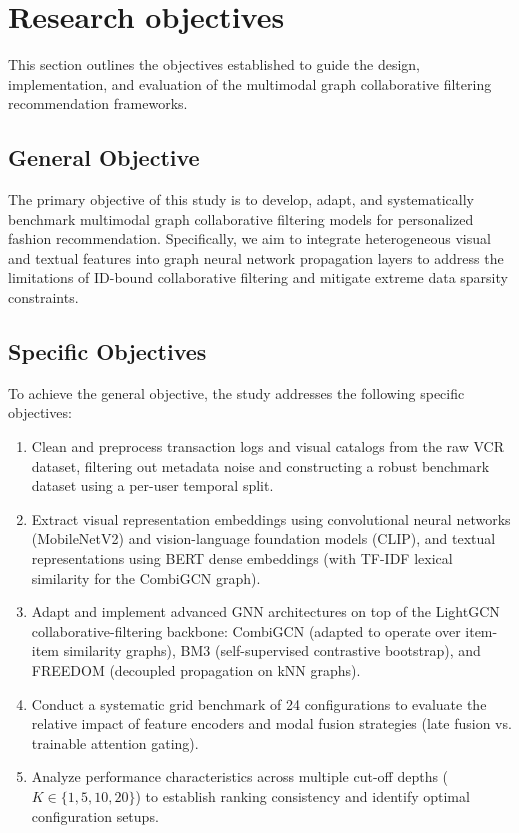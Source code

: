 \section{Research objectives}

This section outlines the objectives established to guide the design, implementation, and evaluation of the multimodal graph collaborative filtering recommendation frameworks.

\subsection{General Objective}

The primary objective of this study is to develop, adapt, and systematically benchmark multimodal graph collaborative filtering models for personalized fashion recommendation. Specifically, we aim to integrate heterogeneous visual and textual features into graph neural network propagation layers to address the limitations of ID-bound collaborative filtering and mitigate extreme data sparsity constraints.

\subsection{Specific Objectives}

To achieve the general objective, the study addresses the following specific objectives:
\begin{enumerate}
    \item Clean and preprocess transaction logs and visual catalogs from the raw VCR dataset, filtering out metadata noise and constructing a robust benchmark dataset using a per-user temporal split.
    \item Extract visual representation embeddings using convolutional neural networks (MobileNetV2) and vision-language foundation models (CLIP), and textual representations using BERT dense embeddings (with TF-IDF lexical similarity for the CombiGCN graph).
    \item Adapt and implement advanced GNN architectures on top of the LightGCN collaborative-filtering backbone: CombiGCN (adapted to operate over item-item similarity graphs), BM3 (self-supervised contrastive bootstrap), and FREEDOM (decoupled propagation on kNN graphs).
    \item Conduct a systematic grid benchmark of 24 configurations to evaluate the relative impact of feature encoders and modal fusion strategies (late fusion vs. trainable attention gating).
    \item Analyze performance characteristics across multiple cut-off depths ($K \in \{1, 5, 10, 20\}$) to establish ranking consistency and identify optimal configuration setups.
\end{enumerate}
